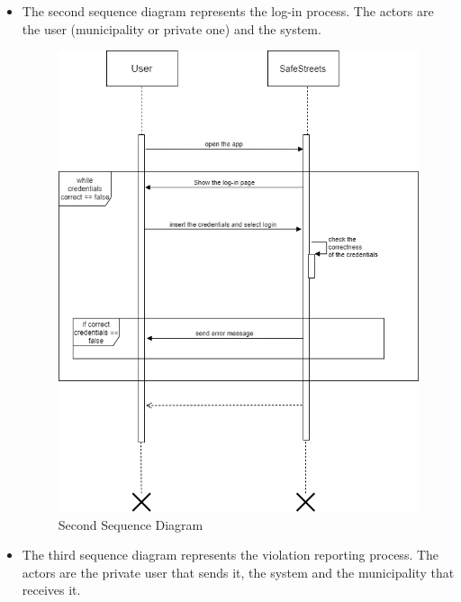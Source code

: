 \documentclass[titlepage]{article}
\begin{document}
\begin{itemize}
\newpage



\item The second sequence diagram represents the log-in process. The actors are the user (municipality or private one) and the system. 

\begin{figure}[h]
	\includegraphics[scale=0.51]{Sequence Diagrams/Sequence diagram log-in.png}
	\centering
	\caption{Second Sequence Diagram}
\end{figure}
\FloatBarrier

\newpage


\item The third sequence diagram represents the violation reporting process. The actors are the private user that sends it, the system and the municipality that receives it.


\end{itemize}
\end{document}
